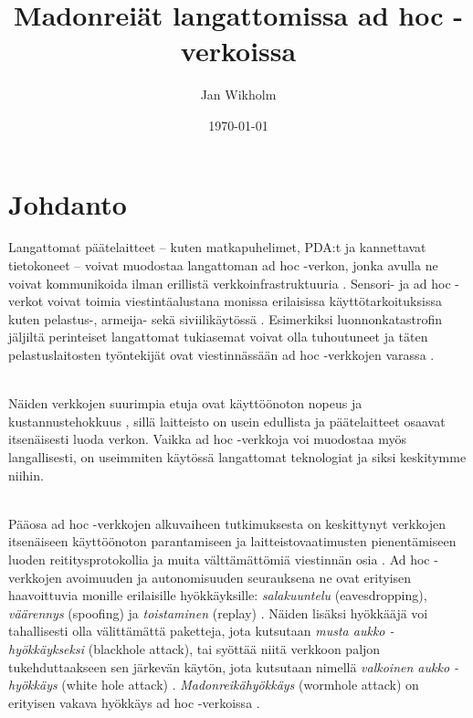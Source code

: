 \documentclass[finnish]{tktltiki2}
\title{Madonreiät langattomissa ad hoc -verkoissa}
\author{Jan Wikholm}
\date{\today}
\theoremstyle{definition}
\theoremstyle{remark}
\begin{document}

\frontmatter      %

\maketitle        %
\makeabstract     %

\tableofcontents  %


\mainmatter       %

\section{Johdanto}



Langattomat päätelaitteet -- kuten matkapuhelimet, PDA:t ja kannettavat tietokoneet -- voivat muodostaa langattoman ad hoc -verkon, jonka avulla ne voivat kommunikoida ilman erillistä verkkoinfrastruktuuria \cite{delphi}. Sensori- ja ad hoc -verkot voivat toimia viestintäalustana monissa erilaisissa käyttötarkoituksissa kuten pelastus-, armeija- \cite{leashes} sekä  siviilikäytössä \cite{liteworp}. Esimerkiksi luonnonkatastrofin jäljiltä perinteiset langattomat tukiasemat voivat olla tuhoutuneet ja täten pelastuslaitosten työntekijät ovat viestinnässään ad hoc -verkkojen varassa \cite{leashes}.

\noindent \\
Näiden verkkojen suurimpia etuja ovat käyttöönoton nopeus ja kustannustehokkuus \cite{delphi,leashes}, sillä laitteisto on usein edullista ja päätelaitteet osaavat itsenäisesti luoda verkon. Vaikka ad hoc -verkkoja voi muodostaa myös langallisesti, on useimmiten käytössä langattomat teknologiat \cite{leashes} ja siksi keskitymme niihin.

\noindent \\
Pääosa ad hoc -verkkojen alkuvaiheen tutkimuksesta on keskittynyt verkkojen itsenäiseen käyttöönoton parantamiseen ja laitteistovaatimusten pienentämiseen luoden reititysprotokollia ja muita välttämättömiä viestinnän osia \cite{liteworp}. Ad hoc -verkkojen avoimuuden ja autonomisuuden seurauksena ne ovat erityisen haavoittuvia monille erilaisille hyökkäyksille: \emph{salakuuntelu} (eavesdropping), \emph{väärennys} (spoofing) ja \emph{toistaminen} (replay) \cite{leashes}. Näiden lisäksi hyökkääjä voi tahallisesti olla välittämättä paketteja, jota kutsutaan \emph{musta aukko -hyökkäykseksi} (blackhole attack), tai syöttää niitä verkkoon paljon tukehduttaakseen sen järkevän käytön, jota kutsutaan nimellä \emph{valkoinen aukko -hyökkäys} (white hole attack) \cite{delphi}. \emph{Madonreikähyökkäys} (wormhole attack) on erityisen vakava hyökkäys ad hoc -verkoissa \cite{liteworp}.
\end{document}

